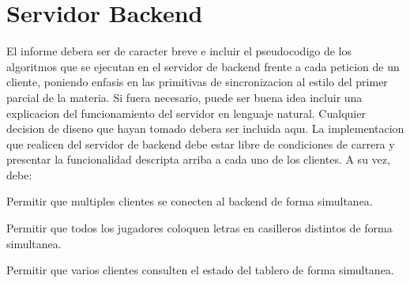 \section{Servidor Backend}

 El informe debera ser de caracter breve e incluir el pseudocodigo de los algoritmos que se ejecutan en el servidor de backend frente a cada peticion de un cliente, poniendo enfasis en las primitivas de sincronizacion al estilo del primer parcial de la materia. Si fuera necesario, puede ser buena idea incluir una explicacion del funcionamiento del servidor en lenguaje natural. Cualquier decision de diseno que hayan tomado debera ser incluida aquı. La implementacion que realicen del servidor de backend debe estar libre de condiciones de carrera y presentar la funcionalidad descripta arriba a cada uno de los clientes. A su vez, debe:
 
Permitir que multiples clientes se conecten al backend de forma simultanea.

Permitir que todos los jugadores coloquen letras en casilleros distintos de forma simultanea.

Permitir que varios clientes consulten el estado del tablero de forma simultanea.
